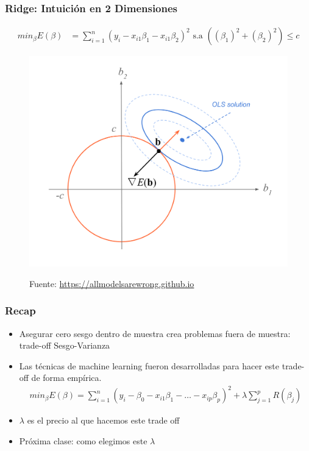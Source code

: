 \documentclass[
  shownotes,
  xcolor={svgnames},
  hyperref={colorlinks,citecolor=DarkBlue,linkcolor=andesred,urlcolor=DarkBlue}
  , aspectratio=169]{beamer}
\begin{document}
\begin{frame}[fragile]
\frametitle{Ridge: Intuición en 2 Dimensiones }

\begin{align}
     min_{\beta} E(\beta) &= \sum_{i=1}^n (y_i - x_{i1}\beta_1 - x_{i1}\beta_2)^2  \text{ s.a }   \left( (\beta_1)^2 + (\beta_2)^2 \right) \leq c 
  \end{align}

\begin{figure}[H] \centering
            \captionsetup{justification=centering}
              \includegraphics[scale=0.3]{figures/ridge4}
 
\tiny
Fuente: \url{https://allmodelsarewrong.github.io}
\end{figure}

\end{frame}


\begin{frame}[fragile]
\frametitle{Recap}
\begin{itemize}
    \item Asegurar cero sesgo dentro de muestra crea problemas fuera de muestra: trade-off Sesgo-Varianza
    \medskip
    \item Las técnicas de machine learning fueron desarrolladas para hacer este trade-off de forma empírica.
    \medskip
    \begin{align}
min_{\beta} E(\beta) = \sum_{i=1}^n (y_i-\beta_0 - x_{i1}\beta_1 - \dots - x_{ip}\beta_p)^2 + \lambda \sum_{j=1}^p R(\beta_j)
\end{align}
\item $\lambda$ es el precio al que hacemos este trade off
\medskip
\item Próxima clase: como elegimos este $\lambda$
 
\end{itemize}
 

 \end{frame}


\end{document}
